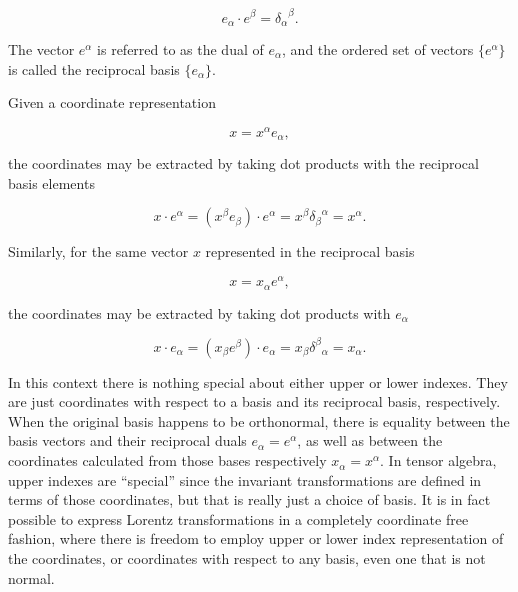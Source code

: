\begin{equation}\label{eqn:gramSchmidtLorentz:130}
e_\alpha \cdot e^\beta = {\delta_\alpha}^\beta.
\end{equation}

The vector $e^\alpha$ is referred to as the dual of $e_\alpha$, and the ordered set of vectors $\{e^\alpha\}$ is called the reciprocal basis $\{e_\alpha\}$.

Given a coordinate representation

\begin{equation}\label{eqn:gramSchmidtLorentz:880}
x = x^\alpha e_\alpha,
\end{equation}

the coordinates may be extracted by taking dot products with the reciprocal basis elements

\begin{equation}\label{eqn:gramSchmidtLorentz:340}
x \cdot e^\alpha = (x^\beta e_\beta) \cdot e^\alpha = x^\beta {\delta_\beta}^\alpha = x^\alpha.
\end{equation}

Similarly, for the same vector $x$ represented in the reciprocal basis

\begin{equation}\label{eqn:gramSchmidtLorentz:900}
x = x_\alpha e^\alpha,
\end{equation}

the coordinates may be extracted by taking dot products with $e_\alpha$

\begin{equation}\label{eqn:gramSchmidtLorentz:340b}
x \cdot e_\alpha = (x_\beta e^\beta) \cdot e_\alpha = x_\beta {\delta^\beta}_\alpha = x_\alpha.
\end{equation}

In this context there is nothing special about either upper or lower indexes.  They are just coordinates with respect to a basis and its reciprocal basis, respectively.  When the original basis happens to be orthonormal, there is equality between the basis vectors and their reciprocal duals $e_\alpha = e^\alpha$, as well as between the coordinates calculated from those bases respectively $x_\alpha = x^\alpha$.  In tensor algebra, upper indexes are ``special'' since the invariant transformations are defined in terms of those coordinates, but that is really just a choice of basis.  It is in fact possible \citep{doran2003gap} to express Lorentz transformations in a completely coordinate free fashion, where there is freedom to employ upper or lower index representation of the coordinates, or coordinates with respect to any basis, even one that is not normal.

